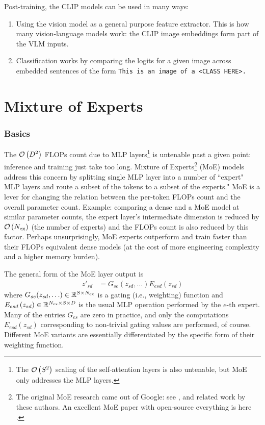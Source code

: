 \documentclass[11pt]{article}
\begin{document}
Post-training, the CLIP models can be used in many ways:
\begin{enumerate}
    \item Using the vision model as a general purpose feature extractor. This is how many
        vision-language models work: the CLIP image embeddings form part of the VLM inputs.
    \item Classification works by comparing the logits for a given image across embedded sentences
        of the form \texttt{This is an image of a <CLASS HERE>.}
\end{enumerate}



\newpage
\part{Mixture of Experts}

\section{Basics}

The $ \mathcal{O} \left(  D ^{ 2 } \right)  $ FLOPs count due to MLP layers\footnote{The $ \mathcal{O} \left( S
^{ 2 } \right)  $ scaling of the self-attention layers is also untenable, but MoE only addresses the
MLP layers.} is untenable past a given point: inference and training just take too long.  Mixture of
Experts\footnote{The original MoE research came out of Google: see
    \cite{fedus2022switchtransformersscalingtrillion},
    \cite{shazeer2017outrageouslylargeneuralnetworks} and related work by these authors. An
excellent MoE paper with open-source everything is here
\cite{muennighoff2024olmoeopenmixtureofexpertslanguage}. } (MoE) models address this concern by
splitting single MLP layer into a number of ``expert" MLP layers and route a subset of the tokens to
a subset of the experts." MoE is a lever for changing the relation between the per-token FLOPs count
and the overall parameter count. Example: comparing a dense and a MoE model at similar parameter counts, the
expert layer's intermediate dimension is reduced by $ \mathcal{O} \left( N _{ {\rm ex} } \right)  $ (the
number of experts) and the FLOPs count is also reduced by this factor. Perhaps unsurprisingly, MoE
experts outperform and train faster than their FLOPs equivalent dense models (at the cost of more
engineering complexity and a higher memory burden).

The general form of the MoE layer output is
\begin{align}
    z' _{ sd } &=G _{ se }(z _{ sd }, \ldots )E _{ esd } \left ( z _{ sd } \right ) \label{eq_general_moe}
\end{align}
where $ G _{ se }(z _{ sd }, \ldots ) \in \mathbb{R} ^{ S \times N _{ {\rm ex}  } } $ is a gating (i.e.,
weighting) function and $ E _{ esd } \left ( z _{ sd } \right ) \in \mathbb{R} ^{ N _{ {\rm ex}
}\times S \times D } $ is the usual MLP operation performed by the $ e $-th expert. Many of the
entries $ G _{ es } $  are zero in practice, and only the computations $ E _{ esd } \left ( z _{ sd
} \right )$ corresponding to non-trivial gating values are performed, of course. Different MoE
variants are essentially differentiated by the specific form of their weighting function.
\end{document}
